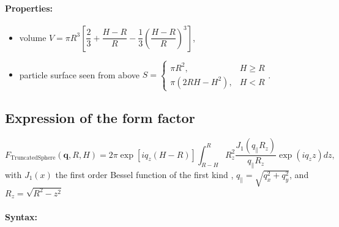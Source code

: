 \paragraph{Properties:}
\begin{itemize}
\item volume $V=\pi R^3 \left[\dfrac{2}{3} + \dfrac{H-R}{R} - \dfrac{1}{3}\left(\dfrac{H-R}{R}\right)^3\right]$,
\item particle surface seen from above $S = \left\{\begin{array}{ll} \pi R^2, & H \geq R \\
         \pi\left(2RH-H^2\right), & H < R \end{array}\right. $.
\end{itemize}

\subsection{Expression of the form factor}
\begin{equation*}  
F_{\text{TruncatedSphere}}(\mathbf{q},R, H)= 2\pi \exp[i q_z (H-R)]\int_{R-H} ^{R} R_z^2 \frac{J_1(q_{\parallel} R_z) }{q_{\parallel} R_z} \exp(i q_z z) dz,
\end{equation*}
with $J_1(x)$ the first order
Bessel function of the first kind \cite{AbSt64}, $q_{\parallel} =
\sqrt{q_x^2+q_y^2}$, and $R_z = \sqrt{R^2-z^2}$

\paragraph{Syntax:} 


